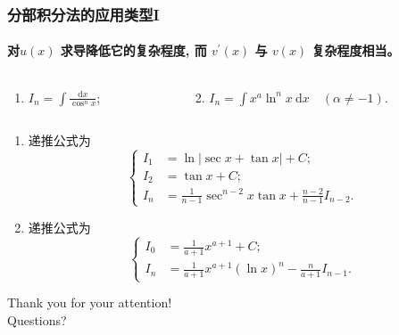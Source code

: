 \documentclass[
10pt,
aspectratio=43,
]{beamer}
\begin{document}
\begin{frame}
	\frametitle{分部积分法的应用类型I}
	\framesubtitle{对$u(x)$ 求导降低它的复杂程度, 而 $v^{\prime}(x)$ 与 $v(x)$ 复杂程度相当。}
	\everymath{\displaystyle}
	\begin{block}{}
		\begin{columns}[onlytextwidth]
			\begin{column}{0.5\textwidth}
				\begin{enumerate}
					\item $I_n=\int \frac{\mathrm{d} x}{\cos ^n x}$;
				\end{enumerate}
			\end{column}
			\begin{column}{0.5\textwidth}
				\begin{enumerate}
					\setcounter{enumi}{1}
					\item $I_n=\int x^a \ln ^n x \mathrm{~d} x \quad(\alpha \neq-1)$.
				\end{enumerate}
			\end{column}
		\end{columns}
	\end{block}
	\begin{exampleblock}{}
		\begin{enumerate}
			\item 递推公式为
			      $$
				      \left\{
				      \begin{aligned}
					      I_1 & =\ln\left|\sec x+\tan x\right|+C;                       \\
					      I_2 & =\tan x+C;                                              \\
					      I_n & =\frac{1}{n-1}\sec^{n-2}x\tan x+\frac{n-2}{n-1}I_{n-2}.
				      \end{aligned}
				      \right.
			      $$
			\item 递推公式为
			      $$
				      \left\{
				      \begin{aligned}
					      I_0 & =\frac{1}{a+1}x^{a+1}+C;                                        \\
					      I_n & =\frac{1}{a+1}x^{a+1}\left(\ln x\right)^n-\frac{n}{a+1}I_{n-1}.
				      \end{aligned}
				      \right.
			      $$
		\end{enumerate}
	\end{exampleblock}
\end{frame}

\begin{frame}[plain]
	\vfill
	\centering
	{
		\centering \Huge \color{white} Thank you for your attention!\\[10pt]Questions?
	}
	\vfill
\end{frame}
\end{document}
